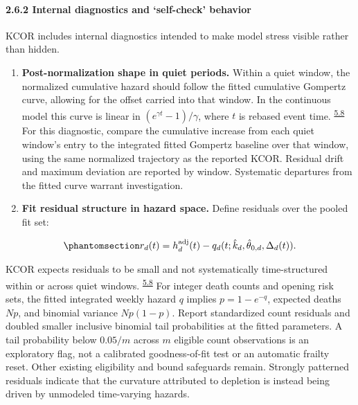 \documentclass[
]{article}
\begin{document}
\paragraph{2.6.2 Internal diagnostics and `self-check' behavior}\label{internal-diagnostics-and-self-check-behavior}

KCOR includes internal diagnostics intended to make model stress visible rather than hidden.

\begin{enumerate}
\def\labelenumi{\arabic{enumi}.}
\item
\textbf{Post-normalization shape in quiet periods.} Within a quiet window, the normalized cumulative hazard should follow the fitted cumulative Gompertz curve, allowing for the offset carried into that window. In the continuous model this curve is linear in \((e^{\gamma t}-1)/\gamma\), where \(t\) is rebased event time. \textsuperscript{\hyperlink{issue-5.8}{5.8}}  {\color{red}For this diagnostic, compare the cumulative increase from each quiet window's entry to the integrated fitted Gompertz baseline over that window, using the same normalized trajectory as the reported KCOR. Residual drift and maximum deviation are reported by window.} Systematic departures from the fitted curve warrant investigation.
\item
  \textbf{Fit residual structure in hazard space.} Define residuals over the pooled fit set:
\end{enumerate}

\begin{equation}\protect\phantomsection\label{eq:si_residuals}{r_{d}(t)=h_d^{\mathrm{adj}}(t)-q_d(t;\hat{k}_d,\hat{\theta}_{0,d},\Delta_d(t)).}\end{equation}

KCOR expects residuals to be small and not systematically time-structured within or across quiet windows. \textsuperscript{\hyperlink{issue-5.8}{5.8}}  {\color{red}For integer death counts and opening risk sets, the fitted integrated weekly hazard \(q\) implies \(p=1-e^{-q}\), expected deaths \(Np\), and binomial variance \(Np(1-p)\). Report standardized count residuals and doubled smaller inclusive binomial tail probabilities at the fitted parameters. A tail probability below \(0.05/m\) across \(m\) eligible count observations is an exploratory flag, not a calibrated goodness-of-fit test or an automatic frailty reset. Other existing eligibility and bound safeguards remain.} Strongly patterned residuals indicate that the curvature attributed to depletion is instead being driven by unmodeled time-varying hazards.
\end{document}
